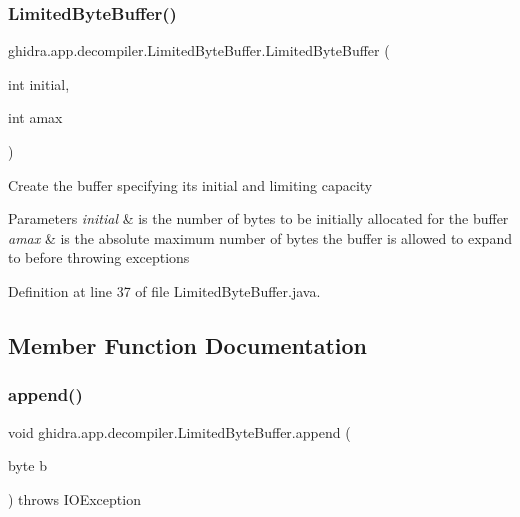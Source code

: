 \subsubsection{\texorpdfstring{LimitedByteBuffer()}{LimitedByteBuffer()}}
{\footnotesize\ttfamily ghidra.\+app.\+decompiler.\+Limited\+Byte\+Buffer.\+Limited\+Byte\+Buffer (\begin{DoxyParamCaption}\item[{int}]{initial,  }\item[{int}]{amax }\end{DoxyParamCaption})\hspace{0.3cm}{\ttfamily [inline]}}

Create the buffer specifying its initial and limiting capacity 
\begin{DoxyParams}{Parameters}
{\em initial} & is the number of bytes to be initially allocated for the buffer \\
\hline
{\em amax} & is the absolute maximum number of bytes the buffer is allowed to expand to before throwing exceptions \\
\hline
\end{DoxyParams}


Definition at line 37 of file Limited\+Byte\+Buffer.\+java.



\subsection{Member Function Documentation}
\mbox{\label{classghidra_1_1app_1_1decompiler_1_1_limited_byte_buffer_aca06d164ed729fd227302717cb27652d}} 
\subsubsection{\texorpdfstring{append()}{append()}}
{\footnotesize\ttfamily void ghidra.\+app.\+decompiler.\+Limited\+Byte\+Buffer.\+append (\begin{DoxyParamCaption}\item[{byte}]{b }\end{DoxyParamCaption}) throws I\+O\+Exception\hspace{0.3cm}{\ttfamily [inline]}}

